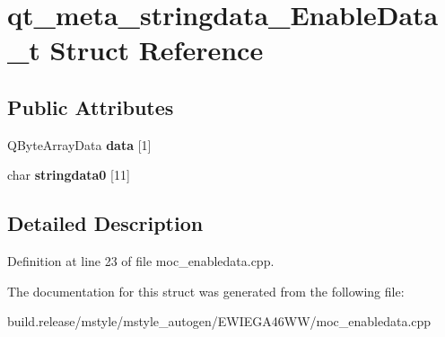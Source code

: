\hypertarget{structqt__meta__stringdata___enable_data__t}{}\section{qt\+\_\+meta\+\_\+stringdata\+\_\+\+Enable\+Data\+\_\+t Struct Reference}
\label{structqt__meta__stringdata___enable_data__t}
\subsection*{Public Attributes}
\begin{DoxyCompactItemize}
\item 
\mbox{\label{structqt__meta__stringdata___enable_data__t_a8954d78a6d58d578ccb47a3b1af62d71}} 
Q\+Byte\+Array\+Data {\bfseries data} \mbox{[}1\mbox{]}
\item 
\mbox{\label{structqt__meta__stringdata___enable_data__t_a967007c385278022df12d44a319812de}} 
char {\bfseries stringdata0} \mbox{[}11\mbox{]}
\end{DoxyCompactItemize}


\subsection{Detailed Description}


Definition at line 23 of file moc\+\_\+enabledata.\+cpp.



The documentation for this struct was generated from the following file\+:\begin{DoxyCompactItemize}
\item 
build.\+release/mstyle/mstyle\+\_\+autogen/\+E\+W\+I\+E\+G\+A46\+W\+W/moc\+\_\+enabledata.\+cpp\end{DoxyCompactItemize}
